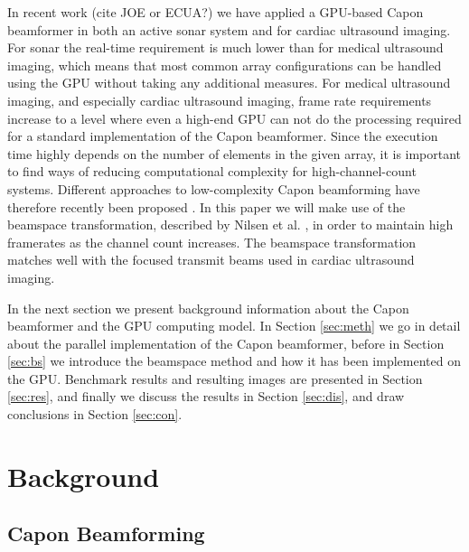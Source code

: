 \documentclass[12pt,journal,onecolumn]{IEEEtran}
\begin{document}
In recent work \cite{asen2012}(cite JOE or ECUA?) we have applied a GPU-based Capon beamformer in both an active sonar system and for cardiac ultrasound imaging. For sonar the real-time requirement is much lower than for medical ultrasound imaging, which means that most common array configurations can be handled using the GPU without taking any additional measures. For medical ultrasound imaging, and especially cardiac ultrasound imaging, frame rate requirements increase to a level where even a high-end GPU can not do the processing required for a standard implementation of the Capon beamformer. Since the execution time highly depends on the number of elements in the given array, it is important to find ways of reducing computational complexity for high-channel-count systems. Different approaches to low-complexity Capon beamforming have therefore recently been proposed \cite{Synnevag2011, Asl2012, Jensen2012, Kim}. In this paper we will make use of the beamspace transformation, described by Nilsen et al. \cite{Nilsen2009}, in order to maintain high framerates as the channel count increases. The beamspace transformation matches well with the focused transmit beams used in cardiac ultrasound imaging. 

In the next section we present background information about the Capon beamformer and the GPU computing model. In Section \ref{sec:meth} we go in detail about the parallel implementation of the Capon beamformer, before in Section \ref{sec:bs} we introduce the beamspace method and how it has been implemented on the GPU. Benchmark results and resulting images are presented in Section \ref{sec:res}, and finally we discuss the results in Section \ref{sec:dis}, and draw conclusions in Section \ref{sec:con}. 

\section{Background}

\subsection{Capon Beamforming}


\end{document}
